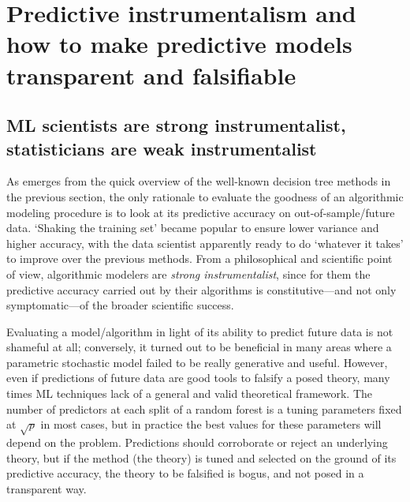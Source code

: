 \documentclass{statsoc}
\begin{document}
%
%
%
%
%

\color{black}

\section{Predictive instrumentalism and  how to make predictive models transparent and falsifiable}
\label{sec:instr}

\subsection{ML scientists are strong instrumentalist, statisticians are weak instrumentalist}

As emerges from the quick overview of the well-known decision tree methods in the previous section, the only rationale to evaluate the goodness of an algorithmic modeling procedure is to look at its 
predictive accuracy on out-of-sample/future data. `Shaking the training set' became popular to ensure lower variance and higher accuracy, with the data scientist apparently ready to 
do `whatever it takes' to improve over the previous methods. From a philosophical and scientific point of view, algorithmic modelers are \emph{strong instrumentalist}, since for 
them the predictive accuracy carried out by their algorithms is constitutive---and not only symptomatic---of the broader scientific success.

Evaluating a model/algorithm in light of its ability to predict future data is not shameful at all; conversely, it turned out to be beneficial in many areas where a parametric 
stochastic model failed to be really generative and useful. However, even if predictions of future data are good tools to falsify a posed theory, many times ML 
techniques lack of a general and valid theoretical framework. The number of predictors at each split of a random forest is a tuning parameters fixed at $\sqrt{p}$ in most cases, but 
in practice the best values for these parameters will depend on the problem. Predictions should corroborate or reject an underlying theory, but if the method (the theory) is tuned 
and selected on the ground of its predictive accuracy, the theory to be falsified is bogus, and not posed in a transparent way.
\end{document}
